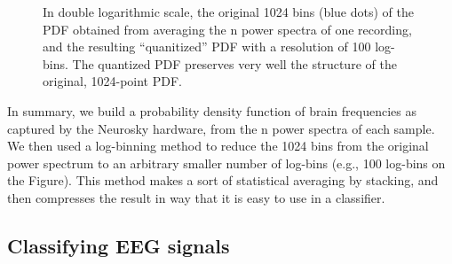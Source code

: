 \begin{figure}[!h]
  \vspace{-0.2cm}
  {}
\caption{In double logarithmic scale, the original 1024 bins (blue dots) of the PDF obtained from averaging the n power spectra of one recording, and the resulting ``quanitized''  PDF with a resolution of 100 log-bins. The quantized PDF preserves very well the structure of the original, 1024-point PDF. }
\label{binnedEEGpowerspec}
\vspace{-0.1cm}
\end{figure}

In summary, we build a probability density function of brain frequencies as captured by the Neurosky hardware, from the n power spectra of each sample. We then used a log-binning method to reduce the 1024 bins from the original power spectrum to an arbitrary smaller number of log-bins (e.g., 100 log-bins on the Figure). This method makes a sort of statistical averaging by stacking, and then compresses the result in way that it is easy to use in a classifier.








\subsection{Classifying EEG signals}


